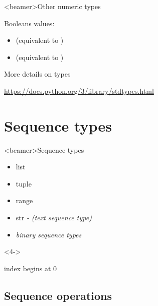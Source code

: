 
\begin{frame}<beamer>{Other numeric types}

  Booleans values:
  \begin{itemize}
    \item<1->  (equivalent to )
    \item<1->  (equivalent to )
  \end{itemize}

  \bigskip

    \begin{center}
    More details on types

    \url{https://docs.python.org/3/library/stdtypes.html}
    \end{center}

\end{frame}


\section{Sequence types}

\begin{frame}<beamer>{Sequence types}

  \begin{itemize}
    \item<1-> list
    \item<1-> tuple
    \item<1-> range
    \item<2-> str \textit{- (text sequence type)}
    \item<3-> \textit{binary sequence types}
  \end{itemize}

  \bigskip

  \begin{center}
    \begin{onlyenv}<4->

    index begins at 0

    \end{onlyenv}
  \end{center}

\end{frame}


\subsection{Sequence operations}

